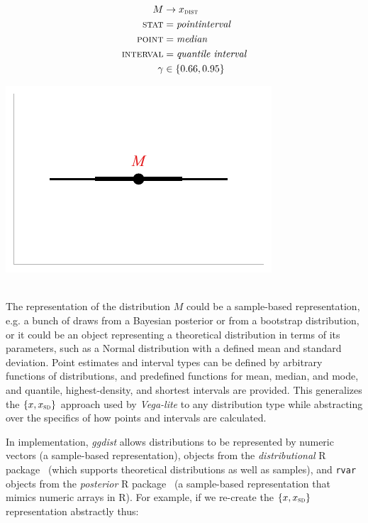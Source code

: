 \documentclass[journal]{vgtc}                     %
\newcommand{\equationfigure}[2]{%
\noindent
\begin{minipage}{.5\columnwidth}
\setlength{\abovedisplayskip}{0pt}
\setlength{\belowdisplayskip}{0pt}
#1\end{minipage}%
\begin{minipage}{.4\columnwidth}\centering #2 \end{minipage}%
\vspace{.5\belowdisplayskip}\\
}
\begin{document}
\equationfigure{
\begin{align*}
M &\rightarrow x_\textsc{dist}\\
\textsc{stat} &= \mathit{pointinterval}\\
\textsc{point} &= \mathit{median}\\
\textsc{interval} &= \textit{quantile interval}\\
\gamma &\in \{0.66, 0.95\}
\end{align*}
}{\includegraphics[width=1.2\columnwidth]{figs/3-stat_pointinterval_A.pdf}}
The representation of the distribution $M$ could be a sample-based representation, e.g. a bunch of draws from a Bayesian posterior or from a bootstrap distribution, or it could be an object representing a theoretical distribution in terms of its parameters, such as a Normal distribution with a defined mean and standard deviation. Point estimates and interval types can be defined by arbitrary functions of distributions, and predefined functions for mean, median, and mode, and quantile, highest-density, and shortest intervals are provided. This generalizes the $\{x, x_\textsc{sd}\}$ approach used by \textit{Vega-lite} to any distribution type while abstracting over the specifics of how points and intervals are calculated.

In implementation, \textit{ggdist} allows distributions to be represented by numeric vectors (a sample-based representation), objects from the \textit{distributional } R package~\cite{oharawild2022distributional} (which supports theoretical distributions as well as samples), and \texttt{rvar} objects from the \textit{posterior} R package~\cite{burkner2022posterior} (a sample-based representation that mimics numeric arrays in R). For example, if we re-create the $\{x, x_\textsc{sd}\}$ representation abstractly thus:
\end{document}
